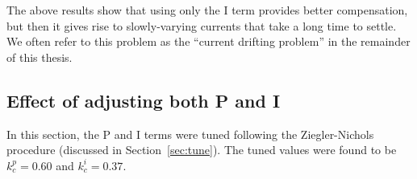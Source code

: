 %

The above results show that using only the I term provides better
compensation, but then it gives rise to slowly-varying currents that
take a long time to settle.  We often refer to this problem as the
``current drifting problem'' in the remainder of this thesis.

 

\subsection{Effect of adjusting both P and I}

In this section, the P and I terms were tuned following the
Ziegler-Nichols procedure (discussed in Section~\ref{sec:tune}). The
tuned values were found to be $k_c^p=0.60$ and $k_c^i=0.37$.




